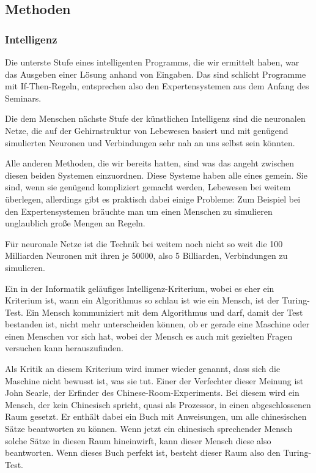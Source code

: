 \subsection{Methoden}
\subsubsection{Intelligenz}
Die unterste Stufe eines intelligenten Programms, die wir ermittelt haben, war das Ausgeben einer Lösung anhand von Eingaben.
Das sind schlicht Programme mit If-Then-Regeln, entsprechen also den Expertensystemen aus dem Anfang des Seminars.

Die dem Menschen nächste Stufe der künstlichen Intelligenz sind die neuronalen Netze, die auf der Gehirnstruktur von Lebewesen basiert und mit genügend simulierten Neuronen und Verbindungen sehr nah an uns selbst sein könnten.

Alle anderen Methoden, die wir bereits hatten, sind was das angeht zwischen diesen beiden Systemen einzuordnen.
Diese Systeme haben alle eines gemein.
Sie sind, wenn sie genügend kompliziert gemacht werden, Lebewesen bei weitem überlegen, allerdings gibt es praktisch dabei einige Probleme: Zum Beispiel bei den Expertensystemen bräuchte man um einen Menschen zu simulieren unglaublich große Mengen an Regeln.

Für neuronale Netze ist die Technik bei weitem noch nicht so weit die 100 Milliarden Neuronen mit ihren je 50000, also 5 Billiarden, Verbindungen zu simulieren.

Ein in der Informatik geläufiges Intelligenz-Kriterium, wobei es eher ein Kriterium ist, wann ein Algorithmus so schlau ist wie ein Mensch, ist der Turing-Test.
Ein Mensch kommuniziert mit dem Algorithmus und darf, damit der Test bestanden ist, nicht mehr unterscheiden können, ob er gerade eine Maschine oder einen Menschen vor sich hat, wobei der Mensch es auch mit gezielten Fragen versuchen kann herauszufinden.


Als Kritik an diesem Kriterium wird immer wieder genannt, dass sich die Maschine nicht bewusst ist, was sie tut.
Einer der Verfechter dieser Meinung ist John Searle, der Erfinder des Chinese-Room-Experiments.
Bei diesem wird ein Mensch, der kein Chinesisch spricht, quasi als Prozessor, in einen abgeschlossenen Raum gesetzt.
Er enthält dabei ein Buch mit Anweisungen, um alle chinesischen Sätze beantworten zu können.
Wenn jetzt ein chinesisch sprechender Mensch solche Sätze in diesen Raum hineinwirft, kann dieser Mensch diese also beantworten.
Wenn dieses Buch perfekt ist, besteht dieser Raum also den Turing-Test.

